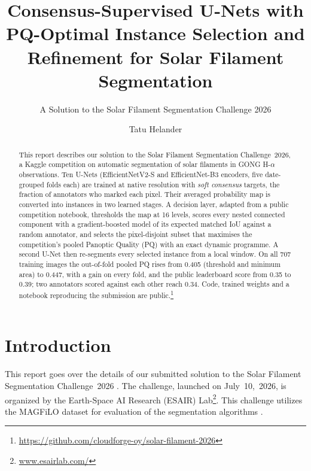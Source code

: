 \documentclass[sigconf]{acmart}
\begin{document}
\title[Consensus U-Nets, PQ-Optimal Selection and Instance Refinement]{Consensus-Supervised U-Nets with PQ-Optimal Instance Selection and Refinement for Solar Filament Segmentation}
\subtitle{A Solution to the Solar Filament Segmentation Challenge 2026} %

\author{Tatu Helander}

\newcommand{\pqfinal}{0.447}
\newcommand{\lbfinal}{0.39}

\begin{abstract}
This report describes our solution to the Solar Filament Segmentation Challenge~2026, a Kaggle competition on automatic segmentation of solar filaments in GONG H-$\alpha$ observations. Ten U-Nets (EfficientNetV2-S and EfficientNet-B3 encoders, five date-grouped folds each) are trained at native resolution with \emph{soft consensus} targets, the fraction of annotators who marked each pixel. Their averaged probability map is converted into instances in two learned stages. A decision layer, adapted from a public competition notebook, thresholds the map at 16 levels, scores every nested connected component with a gradient-boosted model of its expected matched IoU against a random annotator, and selects the pixel-disjoint subset that maximises the competition's pooled Panoptic Quality (PQ) with an exact dynamic programme. A second U-Net then re-segments every selected instance from a local window. On all 707 training images the out-of-fold pooled PQ rises from 0.405 (threshold and minimum area) to \pqfinal, with a gain on every fold, and the public leaderboard score from 0.35 to \lbfinal; two annotators scored against each other reach 0.34. Code, trained weights and a notebook reproducing the submission are public.\footnote{\url{https://github.com/cloudforge-oy/solar-filament-2026}}
\end{abstract}

\maketitle

\section{Introduction}
This report goes over the details of our submitted solution to the Solar Filament Segmentation Challenge~2026 \cite{filament-segmentation-2026}. The challenge, launched on July~10,~2026, is organized by the Earth-Space AI Research (ESAIR) Lab\footnote{\href{https://www.esairlab.com/home}{www.esairlab.com/}}. This challenge utilizes the MAGFiLO dataset for evaluation of the segmentation algorithms \cite{ahmadzadeh2024dataset}.
\end{document}
